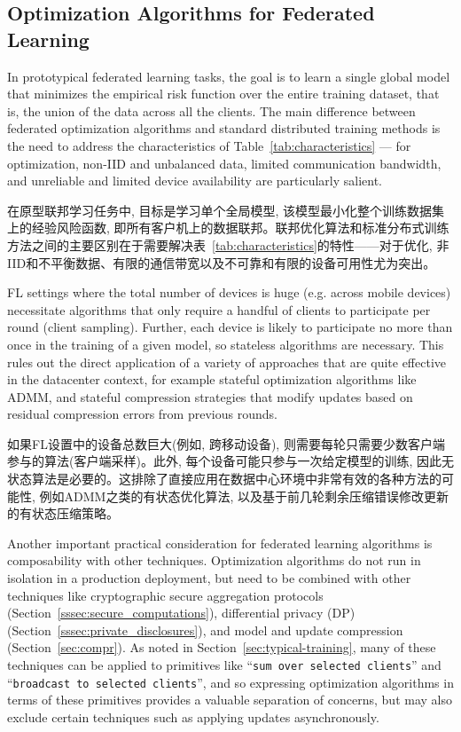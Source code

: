 \subsection{Optimization Algorithms for Federated Learning}\label{sec:optimization}
In prototypical federated learning tasks, the goal is to learn a single global model that minimizes the empirical risk function over the entire training dataset, that is, the union of the data across all the clients. The main difference between federated optimization algorithms and standard distributed training methods     is the need to address the characteristics of Table~\ref{tab:characteristics} --- for optimization, non-IID and unbalanced data, limited communication bandwidth, and unreliable and limited device availability are particularly salient. 

在原型联邦学习任务中, 目标是学习单个全局模型, 该模型最小化整个训练数据集上的经验风险函数, 即所有客户机上的数据联邦。联邦优化算法和标准分布式训练方法之间的主要区别在于需要解决表~\ref{tab:characteristics}的特性——对于优化, 非IID和不平衡数据、有限的通信带宽以及不可靠和有限的设备可用性尤为突出。

FL settings where the total number of devices is huge (e.g. across mobile devices) necessitate algorithms that only require a handful of clients to participate per round (client sampling). Further, each device is likely to participate no more than once in the training of a given model, so stateless algorithms are necessary. This rules out the direct application of a variety of approaches that are quite effective in the datacenter context, for example stateful optimization algorithms like ADMM, and stateful compression strategies that modify updates based on residual compression errors from previous rounds.

如果FL设置中的设备总数巨大(例如, 跨移动设备), 则需要每轮只需要少数客户端参与的算法(客户端采样)。此外, 每个设备可能只参与一次给定模型的训练, 因此无状态算法是必要的。这排除了直接应用在数据中心环境中非常有效的各种方法的可能性, 例如ADMM之类的有状态优化算法, 以及基于前几轮剩余压缩错误修改更新的有状态压缩策略。


Another important practical consideration for federated learning algorithms is composability with other techniques. Optimization algorithms do not run in isolation in a production deployment, but need to be combined with other techniques like cryptographic secure aggregation protocols (Section~\ref{sssec:secure_computations}), differential privacy (DP) (Section~\ref{sssec:private_disclosures}), and model and update compression (Section~\ref{sec:compr}). As noted in Section~\ref{sec:typical-training}, many of these techniques can be applied to primitives like ``\texttt{sum over selected clients}'' and ``\texttt{broadcast to selected clients}'', and so expressing optimization algorithms in terms of these primitives provides a  valuable separation of concerns, but may also exclude certain techniques such as applying updates asynchronously.

